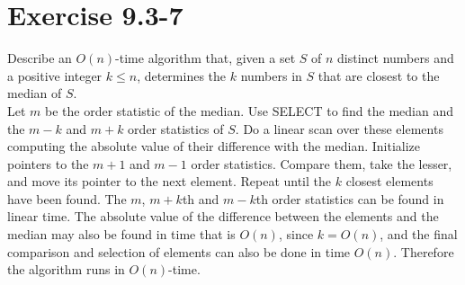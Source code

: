 \documentclass[10pt,a4paper]{article}
\begin{document}
\section*{Exercise 9.3-7}
Describe an $O(n)$-time algorithm that, given a set $S$ of $n$ distinct numbers and a positive integer $k\leq n$, determines the $k$ numbers in $S$ that are closest to the median of $S$.
\vspace*{\baselineskip}
\\
Let $m$ be the order statistic of the median. Use SELECT to find the median and the $m-k$ and $m+k$ order statistics of $S$. Do a linear scan over these elements computing the absolute value of their difference with the median. Initialize pointers to the $m+1$ and $m-1$ order statistics. Compare them, take the lesser, and move its pointer to the next element. Repeat until the $k$ closest elements have been found. The $m$, $m+k$th and $m-k$th order statistics can be found in linear time. The absolute value of the difference between the elements and the median may also be found in time that is $O(n)$, since $k=O(n)$, and the final comparison and selection of elements can also be done in time $O(n)$. Therefore the algorithm runs in $O(n)$-time.
\end{document}
